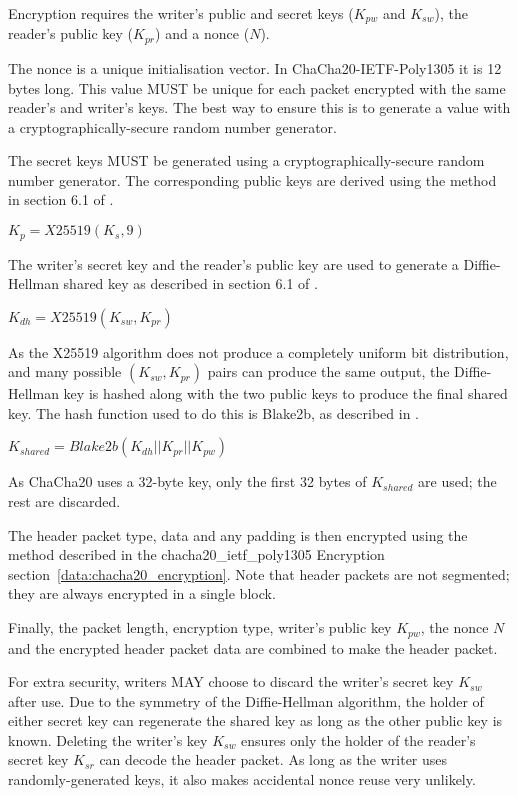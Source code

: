 \documentclass[10pt]{article}
\begin{document}
Encryption requires the writer's public and secret keys ($K_{pw}$ and $K_{sw}$), the reader's public key ($K_{pr}$)
and a nonce ($N$).

The nonce is a unique initialisation vector.
In ChaCha20-IETF-Poly1305 it is 12 bytes long.
This value MUST be unique for each packet encrypted with the same reader's and writer's keys.
The best way to ensure this is to generate a value with a cryptographically-secure random number generator.

The secret keys MUST be generated using a cryptographically-secure random number generator.
The corresponding public keys are derived using the method in section 6.1 of \cite{RFC7748}.

$K_p = X25519(K_s, 9)$

The writer's secret key and the reader's public key are used to generate a Diffie-Hellman shared key as described in
section 6.1 of \cite{RFC7748}.

$K_{dh} = X25519(K_{sw}, K_{pr})$

As the X25519 algorithm does not produce a completely uniform bit distribution,
and many possible $(K_{sw}, K_{pr})$ pairs can produce the same output,
the Diffie-Hellman key is hashed along with the two public keys to produce the final shared key.
The hash function used to do this is Blake2b, as described in \cite{RFC7693}.

$K_{shared} = Blake2b(K_{dh} || K_{pr} || K_{pw})$

As ChaCha20 uses a 32-byte key, only the first 32 bytes of $K_{shared}$ are used; the rest are discarded.

The header packet type, data and any padding is then encrypted using the method described in the
chacha20\_ietf\_poly1305 Encryption section~\ref{data:chacha20_encryption}.
Note that header packets are not segmented; they are always encrypted in a single block.

Finally, the packet length, encryption type, writer's public key $K_{pw}$,
the nonce $N$ and the encrypted header packet data are combined to make the header packet.

For extra security, writers MAY choose to discard the writer's secret key $K_{sw}$ after use.
Due to the symmetry of the Diffie-Hellman algorithm, the holder of either secret key can regenerate the shared
key as long as the other public key is known.
Deleting the writer's key $K_{sw}$ ensures only the holder of the reader's secret key $K_{sr}$ can decode the header
packet.
As long as the writer uses randomly-generated keys, it also makes accidental nonce reuse very unlikely.
\end{document}
